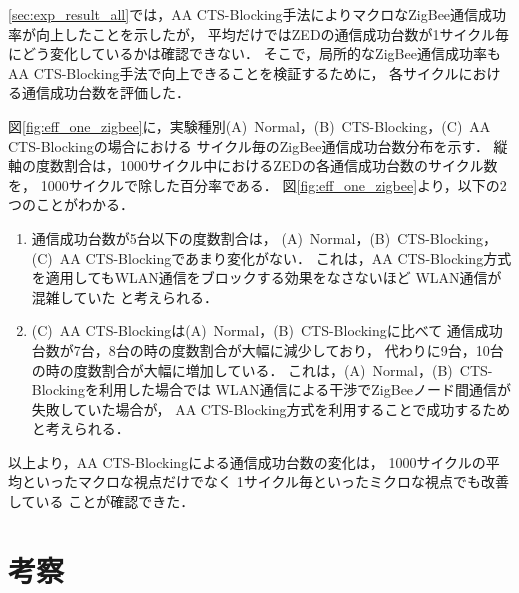\documentclass[12pt]{jreport}
\begin{document}
\ref{sec:exp_result_all}では，AA CTS-Blocking手法によりマクロなZigBee通信成功率が向上したことを示したが，
平均だけではZEDの通信成功台数が1サイクル毎にどう変化しているかは確認できない．
そこで，局所的なZigBee通信成功率もAA CTS-Blocking手法で向上できることを検証するために，
各サイクルにおける通信成功台数を評価した．

図\ref{fig:eff_one_zigbee}に，実験種別(A)~Normal，(B)~CTS-Blocking，(C)~AA CTS-Blockingの場合における
サイクル毎のZigBee通信成功台数分布を示す．
縦軸の度数割合は，1000サイクル中におけるZEDの各通信成功台数のサイクル数を，
1000サイクルで除した百分率である．
図\ref{fig:eff_one_zigbee}より，以下の2つのことがわかる．
\begin{enumerate}
 \item 通信成功台数が5台以下の度数割合は，
 (A)~Normal，(B)~CTS-Blocking， (C)~AA CTS-Blockingであまり変化がない．
これは，AA CTS-Blocking方式を適用してもWLAN通信をブロックする効果をなさないほど
WLAN通信が混雑していた
と考えられる．

 \item  (C)~AA CTS-Blockingは(A)~Normal，(B)~CTS-Blockingに比べて
通信成功台数が7台，8台の時の度数割合が大幅に減少しており，
代わりに9台，10台の時の度数割合が大幅に増加している．
これは，(A)~Normal，(B)~CTS-Blockingを利用した場合では
WLAN通信による干渉でZigBeeノード間通信が失敗していた場合が，
AA CTS-Blocking方式を利用することで成功するためと考えられる．


\end{enumerate}

以上より，AA CTS-Blockingによる通信成功台数の変化は，
1000サイクルの平均といったマクロな視点だけでなく
1サイクル毎といったミクロな視点でも改善している
ことが確認できた．

\section{考察}
\label{sec:considering}
\end{document}
